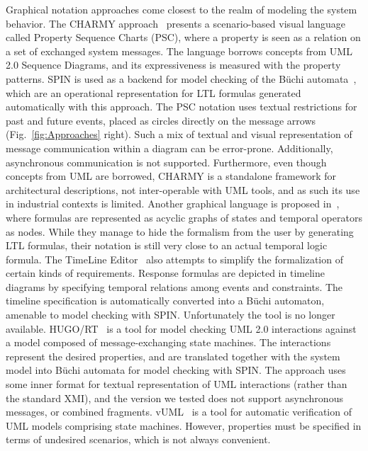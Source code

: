 \documentclass[letter]{llncs}
\begin{document}
Graphical notation approaches come closest to the realm of modeling the system behavior.
The CHARMY approach~\cite{Autili:2007:GSS:1290845.1290859} presents a scenario-based visual language called 
Property Sequence Charts (PSC), where a property is seen as a relation on a set of exchanged
system messages. The language borrows concepts from UML 2.0 Sequence Diagrams, and its expressiveness
is measured with the property patterns. SPIN is used as a backend for model checking of
the B\"uchi automata~\cite{Giannakopoulou:2001:AVT:872023.872506}, which are 
an operational representation for LTL formulas generated automatically with this approach.
The PSC notation uses textual restrictions for past and future events, placed as circles directly on the message arrows (Fig.~\ref{fig:Approaches} right).
Such a mix of textual and visual representation of message communication
within a diagram can be error-prone. Additionally, asynchronous communication is not supported.
Furthermore, even though concepts from UML are borrowed, CHARMY is a standalone framework for architectural descriptions,
not inter-operable with UML tools, and as such its use in industrial contexts is limited.
Another graphical language is proposed in~\cite{Lee97agraphical}, where formulas
are represented as acyclic graphs of states and temporal operators as nodes.
While they manage to hide the formalism from the user by generating LTL formulas, 
their notation is still very close to an actual temporal logic formula.
The TimeLine Editor~\cite{Smith:2001:ECG:882477.883639} also attempts to simplify the formalization of certain
kinds of requirements. Response formulas are depicted in timeline diagrams by specifying temporal relations among events and constraints. 
The timeline specification is automatically converted into a B\"uchi automaton, amenable to model checking with SPIN.
Unfortunately the tool is no longer available.
HUGO/RT~\cite{Knapp:2006:MCU:1762828.1762836} is a tool for model checking UML 2.0 interactions 
against a model composed of message-exchanging state machines. The interactions represent the desired properties,
and are translated together with the system model into B\"uchi automata for model checking with SPIN.
The approach uses some inner format for textual representation of UML interactions (rather than
the standard XMI), and the version we tested does not support asynchronous messages, or combined fragments.
vUML~\cite{Lilius99vuml:a} is a tool for automatic verification of UML models comprising state machines.
However, properties must be specified in terms of undesired scenarios, which is not always convenient.
\end{document}
